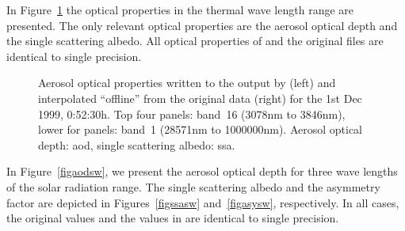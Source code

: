 \begin{appendix}
In Figure~\ref{figoplw} the optical properties in the thermal
wave length range are presented. The only relevant optical properties
are the aerosol optical depth and the single scattering albedo. All
optical properties of \echam{} and the original files are identical to
single precision. 

\begin{figure}[hp]
\vspace{-4cm}
\pcteight
{\vspace{-1.5cm}}
{\vspace{-1.5cm}}
{\vspace{-1.5cm}}
{\vspace{-1.5cm}}
{\vspace{-1.5cm}}
{\vspace{-1.5cm}}
{\vspace{0cm}}
{\vspace{0cm}}
\caption{Aerosol optical properties written to the output by \echam{}
  (left) and interpolated ``offline'' from the original data (right)
  for the 1st Dec 1999, 0:52:30h.
  Top four panels: band~16 (3078nm to 3846nm), lower for panels: band~1
  (28571nm to 1000000nm). Aerosol optical depth: aod, single
  scattering albedo: ssa.}\label{figoplw}
\end{figure} 

In Figure~\ref{figaodsw}, we present the aerosol optical depth for three
wave lengths of the solar radiation range. The single scattering albedo
and the asymmetry factor are depicted in Figures~\ref{figssasw}
and~\ref{figasysw}, respectively. In all cases, the original values
and the values in \echam{} are identical to single precision. 


\end{appendix}
